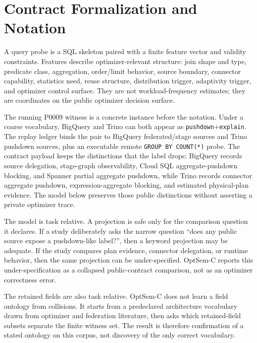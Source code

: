 \section{Contract Formalization and Notation}
\label{sec:model}
A query probe is a SQL skeleton paired with a finite feature vector and validity constraints.  Features describe optimizer-relevant structure: join shape and type, predicate class, aggregation, order/limit behavior, source boundary, connector capability, statistics need, reuse structure, distribution trigger, adaptivity trigger, and optimizer control surface.  They are not workload-frequency estimates; they are coordinates on the public optimizer decision surface.

The running P0009 witness is a concrete instance before the notation.  Under a coarse vocabulary, BigQuery and Trino can both appear as \texttt{pushdown}+\texttt{explain}.  The replay ledger binds the pair to BigQuery federated/stage sources and Trino pushdown sources, plus an executable remote \texttt{GROUP BY COUNT(*)} probe.  The contract payload keeps the distinctions that the label drops: BigQuery records source delegation, stage-graph observability, Cloud SQL aggregate-pushdown blocking, and Spanner partial aggregate pushdown, while Trino records connector aggregate pushdown, expression-aggregate blocking, and estimated physical-plan evidence.  The model below preserves those public distinctions without asserting a private optimizer trace.

The model is task relative.  A projection is safe only for the comparison question it declares.  If a study deliberately asks the narrow question ``does any public source expose a pushdown-like label?'', then a keyword projection may be adequate.  If the study compares plan evidence, connector delegation, or runtime behavior, then the same projection can be under-specified.  OptSem-C reports this under-specification as a collapsed public-contract comparison, not as an optimizer correctness error.

The retained fields are also task relative.  OptSem-C does not learn a field ontology from collisions.  It starts from a predeclared architecture vocabulary drawn from optimizer and federation literature, then asks which retained-field subsets separate the finite witness set.  The result is therefore confirmation of a stated ontology on this corpus, not discovery of the only correct vocabulary.

